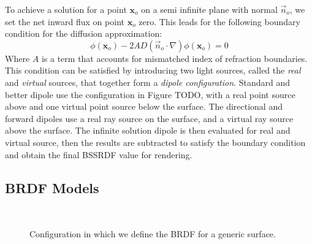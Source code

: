 To achieve a solution for a point $\mathbf{x}_o$ on a semi infinite plane with normal $\vec{n}_o$, we set the net inward flux on point $\mathbf{x}_o$ zero. This leads for the following boundary condition for the diffusion approximation: 
\begin{equation*}
\phi(\mathbf{x}_o) - 2 A D (\vec{n}_o \cdot \nabla) \phi(\mathbf{x}_o) = 0
\end{equation*}
Where $A$ is a term that accounts for mismatched index of refraction boundaries. This condition can be satisfied by introducing two light sources, called the \emph{real} and \emph{virtual} sources, that together form a \emph{dipole configuration}. Standard and better dipole use the configuration in Figure TODO, with a real point source above and one virtual point source below the surface. The directional and forward dipoles use a real ray source on the surface, and a virtual ray source above the surface. The infinite solution dipole is then evaluated for real and virtual source, then the results are subtracted to satisfy the boundary condition and obtain the final BSSRDF value for rendering. 

\subsection{BRDF Models}

\begin{figure}
\centering
   \def\svgwidth{0.8\textwidth}
    \\
\caption{Configuration in which we define the BRDF for a generic surface.} %
\label{fig:brdf_configuration}
\end{figure}

